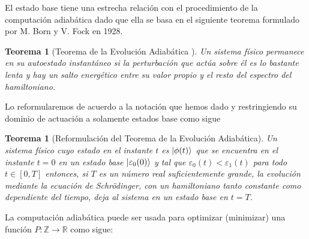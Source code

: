 \documentclass[11pt, spanish]{report}
\numberwithin{equation}{section}
\newtheorem{teo}[defin]{Teorema}
\numberwithin{defin}{section}
\newenvironment{yellowBox}{\begin{tcolorbox}[colback=yellow!5!white,colframe=yellow!75!black]}{\end{tcolorbox}}
\begin{document}
El estado base tiene una estrecha relación con el procedimiento de la computación adiabática dado que ella se basa en el siguiente teorema formulado por M. Born y V. Fock en 1928.\\

\begin{teo}[Teorema de la Evolución Adiabática \cite{Born1928}] Un sistema físico permanece en su autoestado instantáneo si la perturbación que actúa sobre él es lo bastante lenta y hay un salto energético entre su valor propio y el resto del espectro del hamiltoniano.
\end{teo}

Lo reformularemos de acuerdo a la notación que hemos dado y restringiendo su dominio de actuación a solamente estados base como sigue\\

\begin{yellowBox}
\begin{teo}[Reformulación del Teorema de la Evolución Adiabática]\label{TeoAdiab} Un sistema físico cuyo estado en el instante $t$ es $\ket{\phi(t)}$ que se encuentra en el instante $t=0$ en un estado base $\ket{\varepsilon_0(0)}$ y tal que $\varepsilon_0(t)<\varepsilon_1(t)$ para todo $t\in [0,T]$ entonces, si $T$ es un número real suficientemente grande, la evolución mediante la ecuación de Schrödinger, con un hamiltoniano tanto constante como dependiente del tiempo, deja al sistema en un estado base\footnotemark{} en $t=T$.
\end{teo}
\end{yellowBox}


La computación adiabática puede ser usada para optimizar (minimizar) una función $P:\mathbb{Z}\rightarrow\mathbb{R}$ como sigue:
\end{document}
